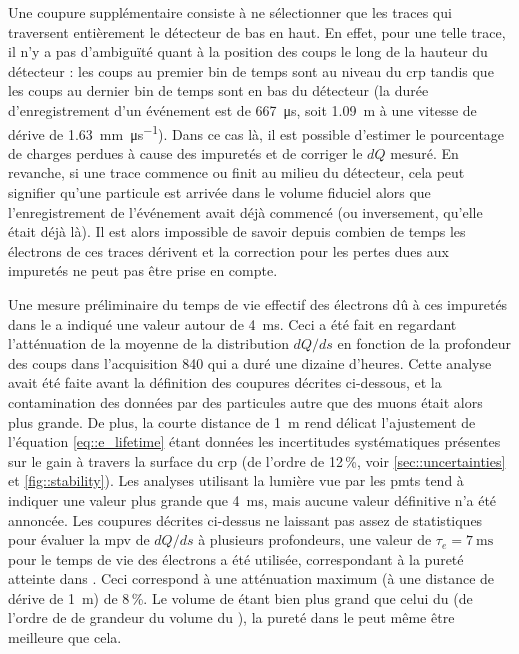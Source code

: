         Une coupure supplémentaire consiste à ne sélectionner que les traces qui traversent entièrement le détecteur de bas en haut. En effet, pour une telle trace, il n'y a pas d'ambiguïté quant à la position des coups le long de la hauteur du détecteur : les coups au premier bin de temps sont au niveau du \gls{crp} tandis que les coups au dernier bin de temps sont en bas du détecteur (la durée d'enregistrement d'un événement est de \SI{667}{\micro\second}, soit \SI{1.09}{\meter} à une vitesse de dérive de \SI{1.63}{\milli\meter\per\micro\second}). Dans ce cas là, il est possible d'estimer le pourcentage de charges perdues à cause des impuretés et de corriger le $dQ$ mesuré. En revanche, si une trace commence ou finit au milieu du détecteur, cela peut signifier qu'une particule est arrivée dans le volume fiduciel alors que l'enregistrement de l'événement avait déjà commencé (ou inversement, qu'elle était déjà là). Il est alors impossible de savoir depuis combien de temps les électrons de ces traces dérivent et la correction pour les pertes dues aux impuretés ne peut pas être prise en compte.

        Une mesure préliminaire du temps de vie effectif des électrons dû à ces impuretés dans le \TOO{} a indiqué une valeur autour de \SI{4}{\milli\second}\cite{Aimard2018}. Ceci a été fait en regardant l'atténuation de la moyenne de la distribution $dQ/ds$ en fonction de la profondeur des coups dans l'acquisition 840 qui a duré une dizaine d'heures. Cette analyse avait été faite avant la définition des coupures décrites ci-dessous, et la contamination des données par des particules autre que des muons était alors plus grande. De plus, la courte distance de \SI{1}{\meter} rend délicat l'ajustement de l'équation \eqref{eq::e_lifetime} étant données les incertitudes systématiques présentes sur le gain à travers la surface du \gls{crp} (de l'ordre de 12\,\%, voir \autoref{sec::uncertainties} et \autoref{fig::stability}). Les analyses utilisant la lumière vue par les \glspl{pmt} tend à indiquer une valeur plus grande que \SI{4}{\milli\second}, mais aucune valeur définitive n'a été annoncée. Les coupures décrites ci-dessus ne laissant pas assez de statistiques pour évaluer la \gls{mpv} de $dQ/ds$ à plusieurs profondeurs, une valeur de $\tau_e = \SI{7}{\milli\second}$ pour le temps de vie des électrons a été utilisée, correspondant à la pureté atteinte dans \protosp{}. Ceci correspond à une atténuation maximum (à une distance de dérive de \SI{1}{\meter}) de 8\,\%. Le volume de \protosp{} étant bien plus grand que celui du \TOO{} (de l'ordre de de grandeur du volume du \SSS{}), la pureté dans le \TOO{} peut même être meilleure que cela.
        
